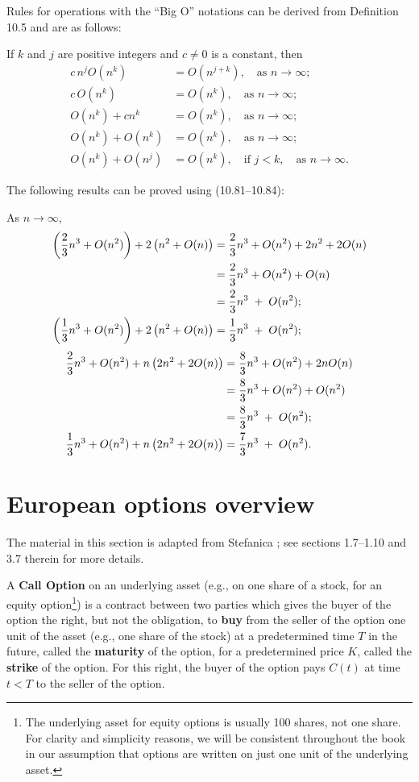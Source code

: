 Rules for operations with the ``Big O'' notations can be derived from Definition
10.5 and are as follows:

If $k$ and $j$ are positive integers and $c \ne 0$ is a constant, then
\begin{align}
c\,n^jO(n^k) &= O(n^{j+k}), \quad \text{as } n \to \infty; \\
c\,O(n^k) &= O(n^k), \quad \text{as } n \to \infty; \\
O(n^k) + cn^k &= O(n^k), \quad \text{as } n \to \infty; \\
O(n^k) + O(n^k) &= O(n^k), \quad \text{as } n \to \infty; \\
O(n^k) + O(n^j) &= O(n^k), \quad \text{if } j < k, \quad \text{as } n \to \infty.
\end{align}

The following results can be proved using (10.81--10.84):

As $n \to \infty$,
\begin{align}
\left(\frac{2}{3}n^3+O(n^2)\right) + 2\left(n^2+O(n)\right)
&= \frac{2}{3}n^3+O(n^2)+2n^2+2O(n) \notag \\
&= \frac{2}{3}n^3+O(n^2)+O(n) \notag \\
&= \frac{2}{3}n^3 \;+\; O(n^2); \\
\left(\frac{1}{3}n^3+O(n^2)\right) + 2\left(n^2+O(n)\right)
&= \frac{1}{3}n^3 \;+\; O(n^2);
\end{align}
\begin{align}
\frac{2}{3}n^3+O(n^2) + n\left(2n^2+2O(n)\right)
&= \frac{8}{3}n^3+O(n^2)+2nO(n) \notag \\
&= \frac{8}{3}n^3+O(n^2)+O(n^2) \notag \\
&= \frac{8}{3}n^3 \;+\; O(n^2); \\
\frac{1}{3}n^3+O(n^2) + n\left(2n^2+2O(n)\right)
&= \frac{7}{3}n^3 \;+\; O(n^2).
\end{align}

\section{European options overview}

The material in this section is adapted from Stefanica \cite{36}; see sections
1.7--1.10 and 3.7 therein for more details.

A \textbf{Call Option} on an underlying asset (e.g., on one share of a stock, for an
equity option\footnote{The underlying asset for equity options is usually 100
shares, not one share. For clarity and simplicity reasons, we will be consistent
throughout the book in our assumption that options are written on just one unit of
the underlying asset.}) is a contract between two parties which gives the buyer of
the option the right, but not the obligation, to \textbf{buy} from the seller of the
option one unit of the asset (e.g., one share of the stock) at a predetermined time
$T$ in the future, called the \textbf{maturity} of the option, for a predetermined
price $K$, called the \textbf{strike} of the option. For this right, the buyer of
the option pays $C(t)$ at time $t < T$ to the seller of the option.

